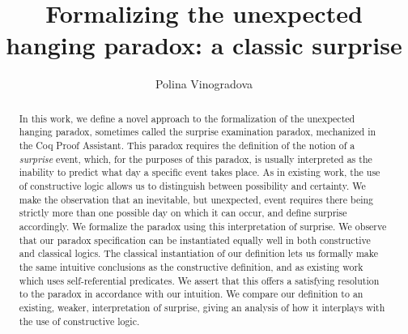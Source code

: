 \documentclass[runningheads]{llncs}
\begin{document}
%
\title{Formalizing the unexpected hanging paradox: a classic surprise} %
%
%
\author{Polina Vinogradova }
%
%
%
\maketitle              %
%
\begin{abstract}

  In this work, we define a novel approach to the formalization of the
  unexpected hanging paradox, sometimes called the surprise examination paradox,
  mechanized in the Coq Proof Assistant.
  This paradox requires the definition of the notion of
  a \emph{surprise} event, which, for the purposes of this paradox, is usually interpreted as
  the inability to predict what day a specific event takes place. As in existing work,
  the use of constructive logic allows us to distinguish between possibility and
  certainty.
  We make the observation that an inevitable, but unexpected, event requires there being strictly
  more than one possible day on which it can occur, and define surprise accordingly. We
  formalize the paradox using this interpretation of surprise.
  We observe that our paradox specification
  can be instantiated equally well in both constructive and classical logics.
  The classical instantiation of our definition lets us formally make the same intuitive
  conclusions as the constructive definition, and as
  existing work which uses self-referential predicates.
  We assert that this offers a satisfying resolution to the paradox in accordance with
  our intuition.
  We compare our definition to an existing, weaker, interpretation of surprise,
  giving an analysis of how it interplays with the use of constructive logic.

\end{abstract}
%
\end{document}

